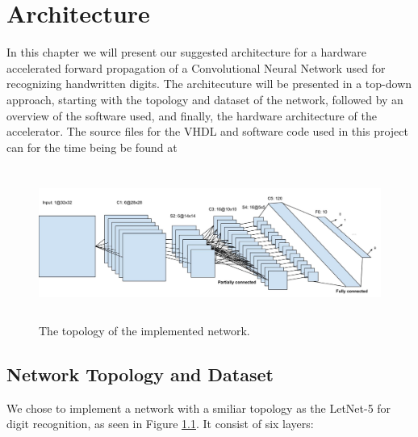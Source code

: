 \chapter{Architecture} \label{chap_method}

In this chapter we will present our suggested architecture for a hardware accelerated forward propagation of a Convolutional Neural Network used for recognizing handwritten digits. The architecuture will be presented in a top-down approach, starting with the topology and dataset of the network, followed by an overview of the software used, and finally, the hardware architecture of the accelerator. The source files for the VHDL and software code used in this project can for the time being be found at \cite{Halvorsen2015}

\begin{figure}[h!]
  \centering
      \includegraphics[width=1.2\textwidth, height=5cm]{Figures/Method/Network_topology}
    \caption{The topology of the implemented network.}
    \label{fig_network_topology}
\end{figure}

\section{Network Topology and Dataset}

We chose to implement a network with a smiliar topology as the LetNet-5 for digit recognition, as seen in Figure \ref{fig_network_topology}. It consist of six layers: 

